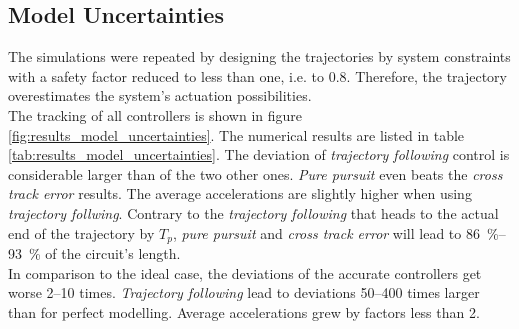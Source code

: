\subsection{Model Uncertainties}
\label{sub:results_model_uncertainties}

The simulations were repeated by designing the trajectories by system constraints with a safety factor reduced to less than one, i.e. to \num{0.8}. Therefore, the trajectory overestimates the system's actuation possibilities. \\
The tracking of all controllers is shown in figure \ref{fig:results_model_uncertainties}. The numerical results are listed in table \ref{tab:results_model_uncertainties}. The deviation of \textit{trajectory following} control is considerable larger than of the two other ones. \textit{Pure pursuit} even beats the \textit{cross track error} results. The average accelerations are slightly higher when using \textit{trajectory follwing}. Contrary to the \textit{trajectory following} that heads to the actual end of the trajectory by $T_p$, \textit{pure pursuit} and \textit{cross track error} will lead to \SIrange{86}{93}{\percent} of the circuit's length.
\\
In comparison to the ideal case, the deviations of the accurate controllers get worse \numrange{2}{10} times. \textit{Trajectory following} lead to deviations \numrange{50}{400} times larger than for perfect modelling. Average accelerations grew by factors less than \num{2}.


